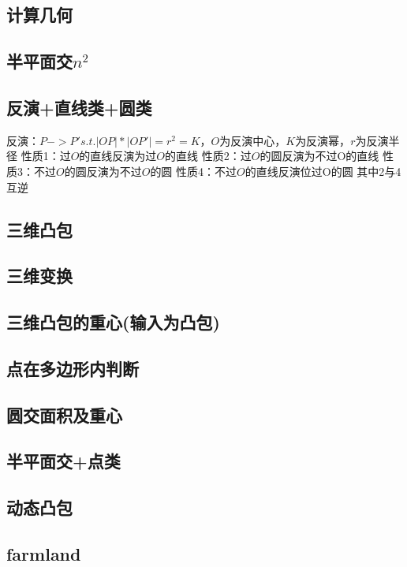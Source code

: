\documentclass[landscape,a4paper]{article}
\begin{document}
\begin{spacing}{0.3}
\begin{multicols}{2}
	\section{计算几何}
	\subsection{半平面交$n^2$}
	
	
	\subsection{反演+直线类+圆类}
	反演：$P->P' s.t. |OP|*|OP'|=r^2=K$，$O$为反演中心，$K$为反演幂，$r$为反演半径
	性质1：过$O$的直线反演为过$O$的直线 性质2：过$O$的圆反演为不过O的直线
	性质3：不过$O$的圆反演为不过$O$的圆 性质4：不过$O$的直线反演位过O的圆
	其中2与4互逆
	
	
	\subsection{三维凸包}
		
	\subsection{三维变换}
		
	\subsection{三维凸包的重心(输入为凸包)}
		
	\subsection{点在多边形内判断}
		
	\subsection{圆交面积及重心}
		
	\subsection{半平面交+点类}
		
	\subsection{动态凸包}
		
	\subsection{farmland}
		

\end{multicols}
\end{spacing}
\end{document}

